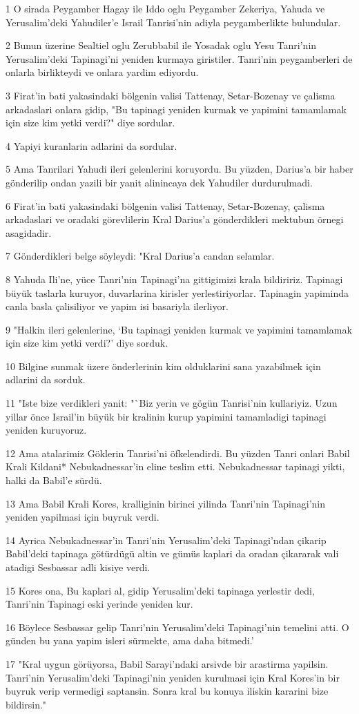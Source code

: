 \par 1 O sirada Peygamber Hagay ile Iddo oglu Peygamber Zekeriya, Yahuda ve Yerusalim'deki Yahudiler'e Israil Tanrisi'nin adiyla peygamberlikte bulundular.
\par 2 Bunun üzerine Sealtiel oglu Zerubbabil ile Yosadak oglu Yesu Tanri'nin Yerusalim'deki Tapinagi'ni yeniden kurmaya giristiler. Tanri'nin peygamberleri de onlarla birlikteydi ve onlara yardim ediyordu.
\par 3 Firat'in bati yakasindaki bölgenin valisi Tattenay, Setar-Bozenay ve çalisma arkadaslari onlara gidip, "Bu tapinagi yeniden kurmak ve yapimini tamamlamak için size kim yetki verdi?" diye sordular.
\par 4 Yapiyi kuranlarin adlarini da sordular.
\par 5 Ama Tanrilari Yahudi ileri gelenlerini koruyordu. Bu yüzden, Darius'a bir haber gönderilip ondan yazili bir yanit alinincaya dek Yahudiler durdurulmadi.
\par 6 Firat'in bati yakasindaki bölgenin valisi Tattenay, Setar-Bozenay, çalisma arkadaslari ve oradaki görevlilerin Kral Darius'a gönderdikleri mektubun örnegi asagidadir.
\par 7 Gönderdikleri belge söyleydi: "Kral Darius'a candan selamlar.
\par 8 Yahuda Ili'ne, yüce Tanri'nin Tapinagi'na gittigimizi krala bildiririz. Tapinagi büyük taslarla kuruyor, duvarlarina kirisler yerlestiriyorlar. Tapinagin yapiminda canla basla çalisiliyor ve yapim isi basariyla ilerliyor.
\par 9 "Halkin ileri gelenlerine, `Bu tapinagi yeniden kurmak ve yapimini tamamlamak için size kim yetki verdi?' diye sorduk.
\par 10 Bilgine sunmak üzere önderlerinin kim olduklarini sana yazabilmek için adlarini da sorduk.
\par 11 "Iste bize verdikleri yanit: "`Biz yerin ve gögün Tanrisi'nin kullariyiz. Uzun yillar önce Israil'in büyük bir kralinin kurup yapimini tamamladigi tapinagi yeniden kuruyoruz.
\par 12 Ama atalarimiz Göklerin Tanrisi'ni öfkelendirdi. Bu yüzden Tanri onlari Babil Krali Kildani* Nebukadnessar'in eline teslim etti. Nebukadnessar tapinagi yikti, halki da Babil'e sürdü.
\par 13 Ama Babil Krali Kores, kralliginin birinci yilinda Tanri'nin Tapinagi'nin yeniden yapilmasi için buyruk verdi.
\par 14 Ayrica Nebukadnessar'in Tanri'nin Yerusalim'deki Tapinagi'ndan çikarip Babil'deki tapinaga götürdügü altin ve gümüs kaplari da oradan çikararak vali atadigi Sesbassar adli kisiye verdi.
\par 15 Kores ona, Bu kaplari al, gidip Yerusalim'deki tapinaga yerlestir dedi, Tanri'nin Tapinagi eski yerinde yeniden kur.
\par 16 Böylece Sesbassar gelip Tanri'nin Yerusalim'deki Tapinagi'nin temelini atti. O günden bu yana yapim isleri sürmekte, ama daha bitmedi.'
\par 17 "Kral uygun görüyorsa, Babil Sarayi'ndaki arsivde bir arastirma yapilsin. Tanri'nin Yerusalim'deki Tapinagi'nin yeniden kurulmasi için Kral Kores'in bir buyruk verip vermedigi saptansin. Sonra kral bu konuya iliskin kararini bize bildirsin."

